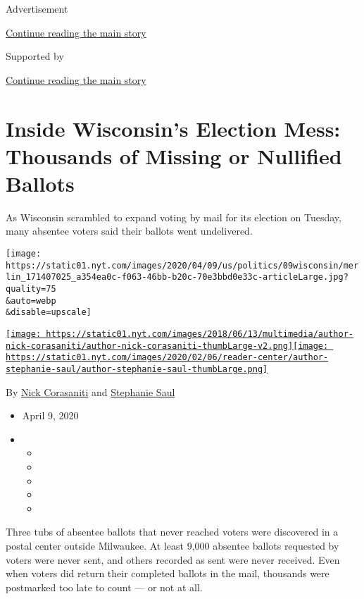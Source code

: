 Advertisement

\protect\hyperlink{after-top}{Continue reading the main story}

Supported by

\protect\hyperlink{after-sponsor}{Continue reading the main story}

\hypertarget{inside-wisconsins-election-mess-thousands-of-missing-or-nullified-ballots}{%
\section{Inside Wisconsin's Election Mess: Thousands of Missing or
Nullified
Ballots}\label{inside-wisconsins-election-mess-thousands-of-missing-or-nullified-ballots}}

As Wisconsin scrambled to expand voting by mail for its election on
Tuesday, many absentee voters said their ballots went undelivered.

\texttt{[image: https://static01.nyt.com/images/2020/04/09/us/politics/09wisconsin/merlin\_171407025\_a354ea0c-f063-46bb-b20c-70e3bbd0e33c-articleLarge.jpg?quality=75\\\&auto=webp\\\&disable=upscale]}

\href{https://www.nytimes.com/by/nick-corasaniti}{\texttt{[image: https://static01.nyt.com/images/2018/06/13/multimedia/author-nick-corasaniti/author-nick-corasaniti-thumbLarge-v2.png]}}\href{https://www.nytimes.com/by/stephanie-saul}{\texttt{[image: https://static01.nyt.com/images/2020/02/06/reader-center/author-stephanie-saul/author-stephanie-saul-thumbLarge.png]}}

By \href{https://www.nytimes.com/by/nick-corasaniti}{Nick Corasaniti}
and \href{https://www.nytimes.com/by/stephanie-saul}{Stephanie Saul}

\begin{itemize}
\item
  April 9, 2020
\item
  \begin{itemize}
  \item
  \item
  \item
  \item
  \item
  \end{itemize}
\end{itemize}

Three tubs of absentee ballots that never reached voters were discovered
in a postal center outside Milwaukee. At least 9,000 absentee ballots
requested by voters were never sent, and others recorded as sent were
never received. Even when voters did return their completed ballots in
the mail, thousands were postmarked too late to count --- or not at all.

